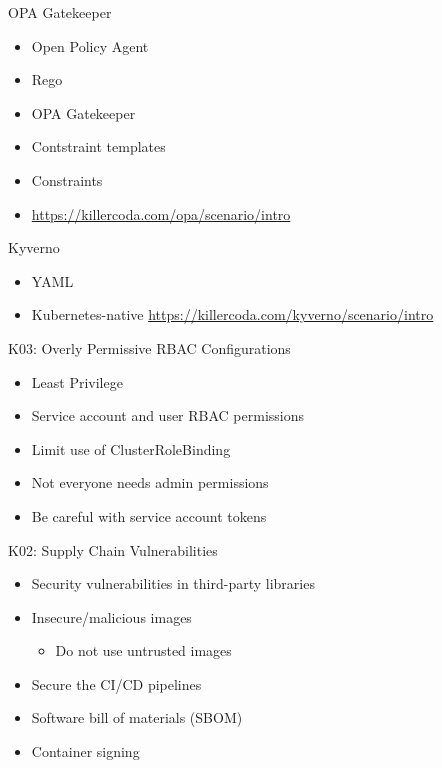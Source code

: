 \documentclass{dcpresentation}
\begin{document}
\begin{frame}{OPA Gatekeeper}
 \begin{itemize}
  \item Open Policy Agent
  \item Rego
  \item OPA Gatekeeper
  \item Contstraint templates
  \item Constraints
  \item \url{https://killercoda.com/opa/scenario/intro}
 \end{itemize}
\end{frame}


\begin{frame}{Kyverno}
 \begin{itemize}
  \item YAML
  \item Kubernetes-native
  \url{https://killercoda.com/kyverno/scenario/intro}
 \end{itemize}
\end{frame}


\begin{frame}{K03: Overly Permissive RBAC Configurations}
  \begin{itemize}
  \item Least Privilege
  \item Service account and user RBAC permissions
  \item Limit use of ClusterRoleBinding
  \item Not everyone needs admin permissions
  \item Be careful with service account tokens
  \end{itemize}
\end{frame}

\begin{frame}{K02: Supply Chain Vulnerabilities}
  \begin{itemize}
  \item Security vulnerabilities in third-party libraries
  \item Insecure/malicious images
  \begin{itemize}
   \item Do not use untrusted images
  \end{itemize}
  \item Secure the CI/CD pipelines
  \item Software bill of materials (SBOM)
  \item Container signing
  \end{itemize}
\end{frame}
\end{document}

